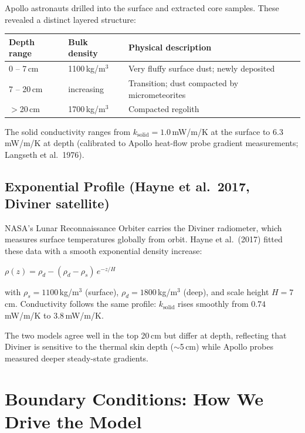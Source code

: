 \documentclass[12pt, a4paper]{article}
\newcommand{\eqbox}[1]{%
  \begin{center}
    \colorbox{boxgray}{\parbox{0.88\linewidth}{\vspace{4pt}\centering#1\vspace{4pt}}}
  \end{center}
}
\begin{document}
Apollo astronauts drilled into the surface and extracted core samples.  These
revealed a distinct layered structure:

\begin{center}
\begin{tabular}{lll}
  \toprule
  Depth range & Bulk density & Physical description \\
  \midrule
  0 -- 7\,cm  & 1100\,kg/m$^3$ & Very fluffy surface dust; newly deposited \\
  7 -- 20\,cm & increasing    & Transition; dust compacted by micrometeorites \\
  $>$20\,cm   & 1700\,kg/m$^3$ & Compacted regolith \\
  \bottomrule
\end{tabular}
\end{center}

The solid conductivity ranges from $k_{\text{solid}} = 1.0$\,mW/m/K at the
surface to $6.3$\,mW/m/K at depth (calibrated to Apollo heat-flow probe
gradient measurements; Langseth et al.\ 1976).

\subsection{Exponential Profile (Hayne et al.\ 2017, Diviner satellite)}

NASA's Lunar Reconnaissance Orbiter carries the Diviner radiometer, which
measures surface temperatures globally from orbit.  Hayne et al.\ (2017) fitted
these data with a smooth exponential density increase:

\eqbox{
  $\rho(z) = \rho_d - (\rho_d - \rho_s)\,e^{-z/H}$
}

\noindent with $\rho_s = 1100$\,kg/m$^3$ (surface), $\rho_d = 1800$\,kg/m$^3$
(deep), and scale height $H = 7$\,cm.  Conductivity follows the same profile:
$k_{\text{solid}}$ rises smoothly from $0.74$\,mW/m/K to $3.8$\,mW/m/K.

\medskip
The two models agree well in the top 20\,cm but differ at depth, reflecting
that Diviner is sensitive to the thermal skin depth ($\sim$5\,cm) while
Apollo probes measured deeper steady-state gradients.

\section{Boundary Conditions: How We Drive the Model}
\end{document}
